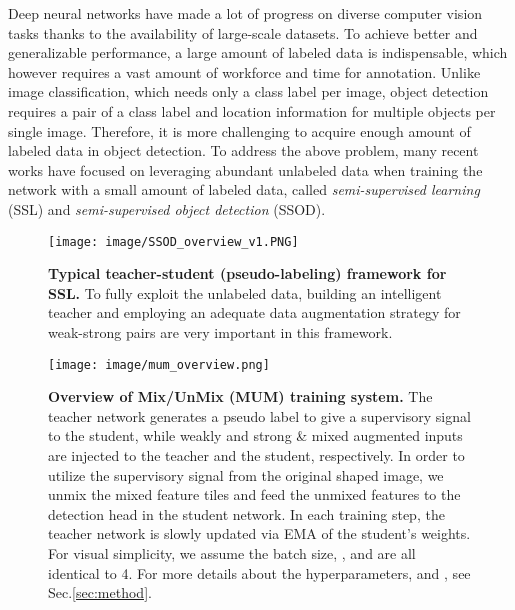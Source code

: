 \documentclass[10pt,twocolumn,letterpaper]{article}
\begin{document}
Deep neural networks have made a lot of progress on diverse computer vision tasks thanks to the availability of large-scale datasets.
To achieve better and generalizable performance, a large amount of labeled data is indispensable, which however requires a vast amount of workforce and time for annotation\cite{russakovsky2015best, bearman2016s, dollar2012pedestrian}.   
Unlike image classification, which needs only a class label per image, object detection requires a pair of a class label and location information for multiple objects per single image. 
Therefore, it is more challenging to acquire enough amount of labeled data in object detection. 
To address the above problem, many recent works have focused on leveraging abundant unlabeled data when training the network with a small amount of labeled data, called \textit{semi-supervised learning} (SSL) and \textit{semi-supervised object detection} (SSOD).

\begin{figure} \texttt{[image: image/SSOD\_overview\_v1.PNG]} 
\vspace{-5mm}
\caption{\textbf{Typical teacher-student (pseudo-labeling) framework for SSL.} 
To fully exploit the unlabeled data, building an intelligent teacher and employing an adequate data augmentation strategy for weak-strong pairs are very important in this framework.
}

\label{fig:ssl_system}
\vspace{-5mm}
\end{figure} 


\begin{figure*}[t] \begin{center}
\texttt{[image: image/mum\_overview.png]}
\end{center}
\caption{\textbf{Overview of Mix/UnMix (MUM) training system.} The teacher network generates a pseudo label to give a supervisory signal to the student, while weakly and strong \& mixed augmented inputs are injected to the teacher and the student, respectively. In order to utilize the supervisory signal from the original shaped image, we unmix the mixed feature tiles and feed the unmixed features to the detection head in the student network. In each training step, the teacher network is slowly updated via EMA of the student's weights. For visual simplicity, we assume the batch size, , and  are all identical to 4. For more details about the hyperparameters,  and , see Sec.\ref{sec:method}.}
\label{fig:tut_overview}
\end{figure*} 
\end{document}
